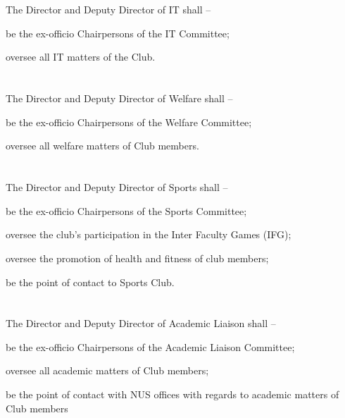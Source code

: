 \section{}
The Director and Deputy Director of IT shall –
	\begin{legal}
	\item be the ex-officio Chairpersons of the IT Committee;
	\item oversee all IT matters of the Club.
	\end{legal}

\section{}
The Director and Deputy Director of Welfare shall –
	\begin{legal}
	\item be the ex-officio Chairpersons of the Welfare Committee;
	\item oversee all welfare matters of Club members.
	\end{legal}

\section{}
The Director and Deputy Director of Sports shall –
	\begin{legal}
	\item be the ex-officio Chairpersons of the Sports Committee;
	\item oversee the club's participation in the Inter Faculty Games (IFG);
	\item oversee the promotion of health and fitness of club members;
	\item be the point of contact to Sports Club.
	\end{legal}

\section{}
The Director and Deputy Director of Academic Liaison shall –
	\begin{legal}
	\item be the ex-officio Chairpersons of the Academic Liaison Committee;
	\item oversee all academic matters of Club members;
	\item be the point of contact with NUS offices with regards to academic matters of Club members
	\end{legal}
